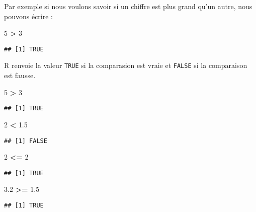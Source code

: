 \documentclass[]{book}
\newenvironment{Shaded}{\begin{snugshade}}{\end{snugshade}}
\newcommand{\DecValTok}[1]{\textcolor[rgb]{0.00,0.00,0.81}{#1}}
\newcommand{\FloatTok}[1]{\textcolor[rgb]{0.00,0.00,0.81}{#1}}
\newcommand{\StringTok}[1]{\textcolor[rgb]{0.31,0.60,0.02}{#1}}
\newcommand{\OperatorTok}[1]{\textcolor[rgb]{0.81,0.36,0.00}{\textbf{#1}}}
\theoremstyle{definition}
\theoremstyle{definition}
\theoremstyle{definition}
\theoremstyle{remark}
\begin{document}
Par exemple si nous voulons savoir si un chiffre est plus grand qu'un
autre, nous pouvons écrire :

\begin{Shaded}
\begin{Highlighting}[]
\DecValTok{5} \OperatorTok{>}\StringTok{ }\DecValTok{3} 
\end{Highlighting}
\end{Shaded}

\begin{verbatim}
## [1] TRUE
\end{verbatim}

R renvoie la valeur \texttt{TRUE} si la comparasion est vraie et
\texttt{FALSE} si la comparaison est fausse.

\begin{Shaded}
\begin{Highlighting}[]
\DecValTok{5} \OperatorTok{>}\StringTok{ }\DecValTok{3}
\end{Highlighting}
\end{Shaded}

\begin{verbatim}
## [1] TRUE
\end{verbatim}

\begin{Shaded}
\begin{Highlighting}[]
\DecValTok{2} \OperatorTok{<}\StringTok{ }\FloatTok{1.5}
\end{Highlighting}
\end{Shaded}

\begin{verbatim}
## [1] FALSE
\end{verbatim}

\begin{Shaded}
\begin{Highlighting}[]
\DecValTok{2} \OperatorTok{<=}\StringTok{ }\DecValTok{2}
\end{Highlighting}
\end{Shaded}

\begin{verbatim}
## [1] TRUE
\end{verbatim}

\begin{Shaded}
\begin{Highlighting}[]
\FloatTok{3.2} \OperatorTok{>=}\StringTok{ }\FloatTok{1.5}
\end{Highlighting}
\end{Shaded}

\begin{verbatim}
## [1] TRUE
\end{verbatim}
\end{document}
